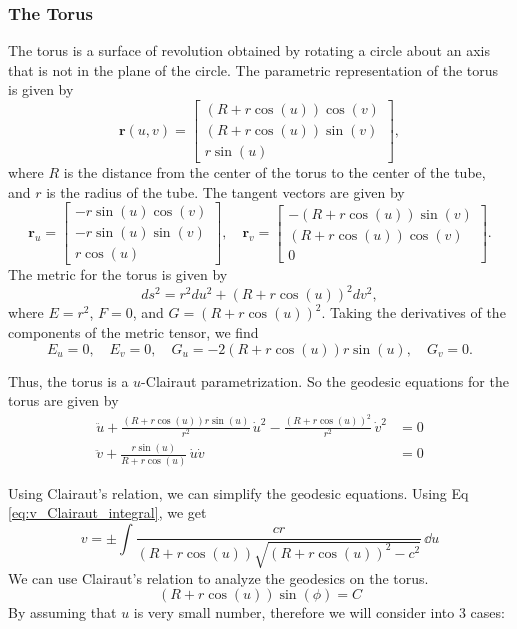 \documentclass[12pt]{article}
\begin{document}
\subsubsection{The Torus}

The torus is a surface of revolution obtained by rotating a circle about an axis that is not in the plane of the circle.
The parametric representation of the torus is given by
\[
    \mathbf{r}(u, v) = \begin{bmatrix} (R + r \cos (u)) \cos (v) \\ (R + r \cos (u)) \sin (v) \\ r \sin (u) \end{bmatrix},
\]
where \(R\) is the distance from the center of the torus to the center of the tube, and \(r\) is the radius of the tube.
The tangent vectors are given by
\[
    \mathbf{r}_u = \begin{bmatrix} -r \sin (u) \cos (v) \\ -r \sin (u) \sin (v) \\ r \cos (u) \end{bmatrix}, \quad \mathbf{r}_v = \begin{bmatrix} -(R + r \cos (u)) \sin (v) \\ (R + r \cos (u)) \cos (v) \\ 0 \end{bmatrix}.
\]
The metric for the torus is given by
\[
    ds^2 = r^2 du^2 + (R + r \cos (u))^2 dv^2,
\]
where \(E = r^2\), \(F = 0\), and \(G = (R + r \cos (u))^2\).
Taking the derivatives of the components of the metric tensor, we find
\[
    E_u = 0, \quad E_v = 0, \quad G_u = -2(R + r \cos (u))r \sin (u), \quad G_v = 0.
\]

Thus, the torus is a $u$-Clairaut parametrization.
So the geodesic equations for the torus are given by
\begin{align*}
    \ddot{u} + \frac{(R + r \cos (u))r \sin (u)}{r^2}\,\dot{u}^2 - \frac{(R + r \cos (u))^2}{r^2}\,\dot{v}^{2} &= 0 \\
    \ddot{v} + \frac{r \sin (u)}{R + r \cos (u)}\,\dot{u}\dot{v} &= 0
\end{align*}

Using Clairaut's relation, we can simplify the geodesic equations.
Using Eq \eqref{eq:v_Clairaut_integral}, we get
\[
    v = \pm \int \frac{cr}{(R + r \cos (u))\sqrt{(R + r \cos (u))^2 - c^2}}\,\dd{u}
\]
We can use Clairaut's relation to analyze the geodesics on the torus.
\[
    (R + r \cos (u)) \sin(\phi) = C
\]
By assuming that $u$ is very small number, therefore we will consider into 3 cases:
\end{document}
